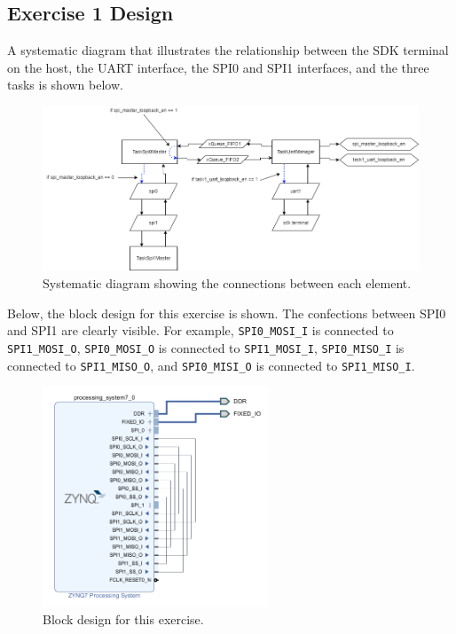 \documentclass[11pt, letterpaper, titlepage]{article}
\begin{document}
\subsection{Exercise 1 Design}
A systematic diagram that illustrates the relationship between the SDK terminal on the host, the UART interface, the SPI0 and SPI1 interfaces, and the three tasks is shown below.
\begin{figure}[H]
    \centering
    \includegraphics[width=\textwidth]{Diagram.png}
    \caption{Systematic diagram showing the connections between each element.}
\end{figure}
Below, the block design for this exercise is shown. The confections between SPI0 and SPI1 are clearly visible. For example, \texttt{SPI0_MOSI_I} is connected to \texttt{SPI1_MOSI_O}, \texttt{SPI0_MOSI_O} is connected to \texttt{SPI1_MOSI_I}, \texttt{SPI0_MISO_I} is connected to \texttt{SPI1_MISO_O}, and \texttt{SPI0_MISI_O} is connected to \texttt{SPI1_MISO_I}.
\begin{figure}[H]
    \centering
    \includegraphics[width=0.6\textwidth]{Diagram2.png}
    \caption{Block design for this exercise.}
\end{figure}
\end{document}
